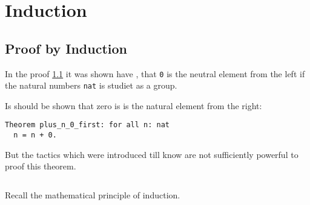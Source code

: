 \section{Induction}

\subsection{Proof by Induction}
In the proof \ref{} it was shown have , %
that \lstinline!0! is the neutral element from the left if the natural numbers \lstinline!nat! is studiet as a group. 

Is should be shown that zero is is the natural element from the right:
\begin{lstlisting}
Theorem plus_n_0_first: for all n: nat
  n = n + 0.  
\end{lstlisting}

But the tactics which were introduced till know are not sufficiently powerful to proof this theorem.

\begin{lstlisting}
\end{lstlisting}

Recall the mathematical principle of induction. %